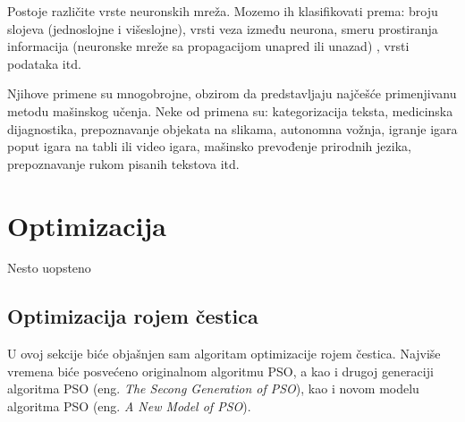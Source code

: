 \documentclass[a4paper]{article}
\begin{document}
{Postoje različite vrste neuronskih mreža. Mozemo ih klasifikovati prema: broju slojeva (jednoslojne i višeslojne), vrsti veza između neurona, smeru
prostiranja informacija (neuronske mreže sa propagacijom unapred ili unazad) \cite{website}, vrsti podataka itd. 

Njihove primene su mnogobrojne, obzirom da predstavljaju najčešće primenjivanu metodu mašinskog učenja. Neke od primena su: kategorizacija teksta,
medicinska dijagnostika, prepoznavanje objekata na slikama, autonomna vožnja, igranje igara poput igara na tabli ili video igara, mašinsko prevođenje
prirodnih jezika, prepoznavanje rukom pisanih tekstova itd. 



\section{Optimizacija}
\label{optimizacija}

Nesto uopsteno

\subsection{Optimizacija rojem čestica}
\label{subsec:pso}
U ovoj sekcije biće objašnjen sam algoritam optimizacije rojem čestica. Najviše vremena biće posvećeno originalnom algoritmu PSO, a kao i drugoj generaciji algoritma PSO (eng. \textit{The Secong Generation of PSO}), kao i novom modelu algoritma PSO 
(eng. \textit{A New Model of PSO}).


}
\end{document}
